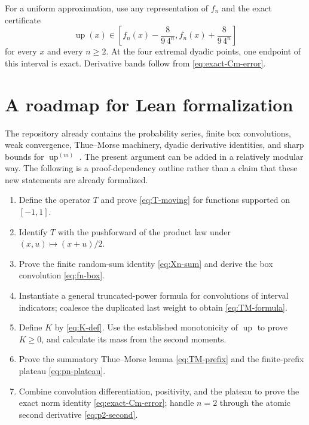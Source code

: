 \documentclass[11pt,oneside]{article}
\theoremstyle{definition}
\theoremstyle{remark}
\newcommand{\Up}{\operatorname{up}}
\begin{document}
For a uniform approximation, use any representation of $f_n$ and the exact certificate
\begin{equation}
 \Up(x)\in\left[f_n(x)-\frac8{9\,4^n},
                 f_n(x)+\frac8{9\,4^n}\right]             \label{eq:certified-band}
\end{equation}
for every $x$ and every $n\ge2$.  At the four extremal dyadic points, one endpoint of this
interval is exact.  Derivative bands follow from \eqref{eq:exact-Cm-error}.

\section{A roadmap for Lean formalization}
\label{sec:Lean-roadmap}

The repository already contains the probability series, finite box convolutions, weak
convergence, Thue--Morse machinery, dyadic derivative identities, and sharp bounds for
$\Up^{(m)}$ \cite{proveit}.  The present argument can be added in a relatively modular way.
The following is a proof-dependency outline rather than a claim that these new statements are
already formalized.

\begin{enumerate}
\item Define the operator $T$ and prove \eqref{eq:T-moving} for functions supported on
      $[-1,1]$.
\item Identify $T$ with the pushforward of the product law under $(x,u)\mapsto(x+u)/2$.
\item Prove the finite random-sum identity \eqref{eq:Xn-sum} and derive the box convolution
      \eqref{eq:fn-box}.
\item Instantiate a general truncated-power formula for convolutions of interval indicators;
      coalesce the duplicated last weight to obtain \eqref{eq:TM-formula}.
\item Define $K$ by \eqref{eq:K-def}.  Use the established monotonicity of $\Up$ to prove
      $K\ge0$, and calculate its mass from the second moments.
\item Prove the summatory Thue--Morse lemma \eqref{eq:TM-prefix} and the finite-prefix plateau
      \eqref{eq:pn-plateau}.
\item Combine convolution differentiation, positivity, and the plateau to prove the exact
      norm identity \eqref{eq:exact-Cm-error}; handle $n=2$ through the atomic second
      derivative \eqref{eq:p2-second}.
\end{enumerate}
\end{document}
